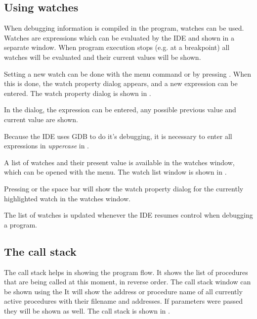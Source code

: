 %
%
\subsection{Using watches}
When debugging information is compiled in the program, watches can be used.
Watches are expressions which can be evaluated by the IDE and shown in a
separate window. When program execution stops (e.g. at a breakpoint) all
watches will be evaluated and their current values will be shown.

Setting a new watch can be done with the  menu 
command or by pressing . When this is done, the watch
property dialog appears, and a new expression can be entered.
The watch property dialog is shown in .


In the dialog, the expression can be entered, any possible previous value
and current value are shown.
\begin{remark}
Because the IDE uses GDB to do it's debugging, it is necessary to enter all
expressions in {\em uppercase} in \freebsd. 
\end{remark}
A list of watches and their present value is available in the watches
window, which can be opened with the  menu.
The watch list window is shown in .


Pressing  or the space bar will show the watch property dialog
for the currently highlighted watch in the watches window.

The list of watches is updated whenever the IDE resumes control when
debugging a program.
%
%
\subsection{The call stack}
\label{se:callstack}
The call stack helps in showing the program flow. It shows the list of
procedures that are being called at this moment, in reverse order.
The call stack window can be shown using the 
It will show the address or procedure name of all currently active 
procedures with their filename and addresses. If parameters were passed
they will be shown as well. The call stack is shown in .


